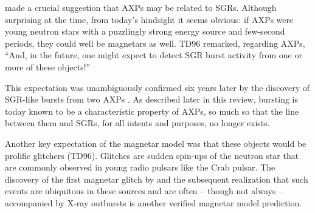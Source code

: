 \documentclass[letterpaper]{ar-1col}
\begin{document}
\citet[][hereafter TD96]{td96a} 
made a crucial suggestion that AXPs may be related to SGRs. Although surprising at the time, from today's
hindsight it seems 
obvious:  if AXPs were young neutron stars with a puzzlingly strong
energy source and few-second periods, they could well be magnetars as well.
TD96 remarked, regarding AXPs, ``And, in
the future, one might expect to detect SGR burst activity
from one or more of these objects!''

This expectation was unambiguously confirmed six years later by the discovery of SGR-like bursts from two AXPs
\citep{gkw02,kgw+03}.
As described later in this review, bursting is today known to be a characteristic property of AXPs,
so much so that the line between them and SGRs, for all intents and purposes, no longer exists.

Another key expectation of the magnetar model was that these objects would be
prolific glitchers (TD96).  Glitches are sudden spin-ups of the neutron star
that are commonly observed in young radio pulsars like the Crab pulsar.
The discovery of the first magnetar glitch by
\citet{klc00} and the subsequent realization that such events are ubiquitous in
these sources and are often -- though not always -- accompanied by X-ray outbursts
\citep[e.g.][]{dkg08}
is another verified magnetar model prediction. 
\end{document}
